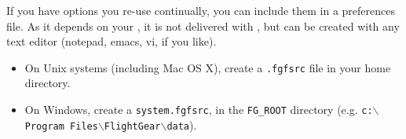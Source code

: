 If you have options you re-use continually, you can include them in a preferences file. As it depends on your
, it is not delivered with \FlightGear{}, but can be created with any text editor (notepad, emacs, vi, if you like).

\begin{itemize}
\item On Unix systems (including Mac OS X), create a \texttt{.fgfsrc} file in your home directory.
\item On Windows, create a \texttt{system.fgfsrc}, in
the \texttt{FG\_ROOT} directory (e.g. \texttt{c:$\backslash$Program Files$\backslash$FlightGear$\backslash$data}).
\end{itemize}

